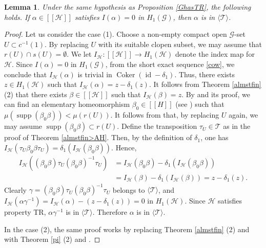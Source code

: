 \documentclass[11pt]{article}
\newtheorem{lemma}[theorem]{Lemma}
\theoremstyle{definition}
\numberwithin{equation}{section}
\newcommand{\Coker}{\operatorname{Coker}}
\newcommand{\id}{\operatorname{id}}
\newcommand{\supp}{\operatorname{supp}}
\newcommand{\G}{\mathcal{G}}
\renewcommand{\H}{\mathcal{H}}
\begin{document}
\begin{lemma}\label{LemBforGhasTR}
Under the same hypothesis as Proposition \ref{GhasTR}, the following holds. 
If $\alpha\in[[\H]]$ satisfies $I(\alpha)=0$ in $H_1(\G)$, 
then $\alpha$ is in $\langle\mathcal{T}\rangle$. 
\end{lemma}
\begin{proof}
Let us consider the case (1). 
Choose a non-empty compact open $\G$-set $U\subset c^{-1}(1)$. 
By replacing $U$ with its suitable clopen subset, 
we may assume that $r(U)\cap s(U)=\emptyset$. 
We let $I_\H:[[\H]]\to H_1(\H)$ denote 
the index map for $\H$. 
Since $I(\alpha)=0$ in $H_1(\G)$, 
from the short exact sequence \eqref{cow}, 
we conclude that $I_\H(\alpha)$ is trivial in $\Coker(\id-\delta_1)$. 
Thus, 
there exists $z\in H_1(\H)$ such that $I_\H(\alpha)=z-\delta_1(z)$. 
It follows from Theorem \ref{almstfin} (2) that 
there exists $\beta\in[[\H]]$ such that $I_\H(\beta)=z$. 
By \cite[Lemma 7.10]{M12PLMS} and its proof, 
we can find an elementary homeomorphism $\beta_0\in[[H]]$ 
(see \cite[Definition 7.6 (1)]{M12PLMS}) 
such that $\mu(\supp(\beta_0\beta))<\mu(r(U))$. 
It follows from \cite[Lemma 6.7]{M12PLMS} that, 
by replacing $U$ again, we may assume $\supp(\beta_0\beta)\subset r(U)$. 
Define the transposition $\tau_U\in\mathcal{T}$ 
as in the proof of Theorem \ref{almstfin>AH}. 
Then, by the definition of $\delta_1$, 
one has $I_\H(\tau_U\beta_0\beta\tau_U)=\delta_1(I_\H(\beta_0\beta))$. 
Hence, 
\begin{align*}
I_\H\left((\beta_0\beta)\tau_U(\beta_0\beta)^{-1}\tau_U\right)
&=I_\H(\beta_0\beta)-\delta_1(I_\H(\beta_0\beta))\\
&=I_\H(\beta)-\delta_1(I_\H(\beta))=z-\delta_1(z). 
\end{align*}
Clearly $\gamma=(\beta_0\beta)\tau_U(\beta_0\beta)^{-1}\tau_U$ 
belongs to $\langle\mathcal{T}\rangle$, 
and $I_\H(\alpha\gamma^{-1})=I_\H(\alpha)-(z-\delta_1(z))=0$ 
in $H_1(\H)$. 
Since $\H$ satisfies property TR, 
$\alpha\gamma^{-1}$ is in $\langle\mathcal{T}\rangle$. 
Therefore $\alpha$ is in $\langle\mathcal{T}\rangle$. 

In the case (2), 
the same proof works 
by replacing Theorem \ref{almstfin} (2) and \cite[Lemma 6.7]{M12PLMS} 
with Theorem \ref{pi} (2) and \cite[Proposition 4.11]{M15crelle}. 
\end{proof}
\end{document}

